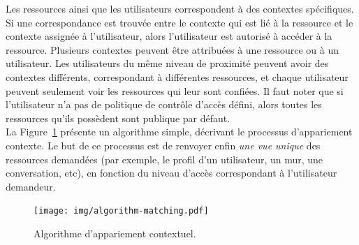 \documentclass[a4paper]{article}
\begin{document}
Les ressources ainsi que les utilisateurs correspondent à des contextes spécifiques. Si une correspondance est trouvée entre le contexte qui est lié à la ressource et le contexte assignée à l'utilisateur, alors l'utilisateur est autorisé à accéder à la ressource. Plusieurs contextes peuvent être attribuées à une ressource ou à un utilisateur. Les utilisateurs du même niveau de proximité peuvent avoir des contextes différents, correspondant à différentes ressources, et chaque utilisateur peuvent seulement voir les ressources qui leur sont confiées. Il faut noter que si l'utilisateur n'a pas de politique de contrôle d'accès défini, alors toutes les ressources qu'ils possèdent sont publique par défaut.\\


La Figure~\ref{fig:context_matching} présente un algorithme simple, décrivant le processus d'appariement contexte. Le but de ce processus est de renvoyer enfin \textit{une vue unique} des ressources demandées (par exemple, le profil d'un utilisateur, un mur, une conversation, etc), en fonction du niveau d'accès correspondant à l'utilisateur demandeur.\\

\begin{figure}[h]
  \begin{center}
    \texttt{[image: img/algorithm-matching.pdf]}
        \caption{Algorithme d'appariement contextuel.}
        \label{fig:context_matching}
  \end{center}
\end{figure}
\end{document}
